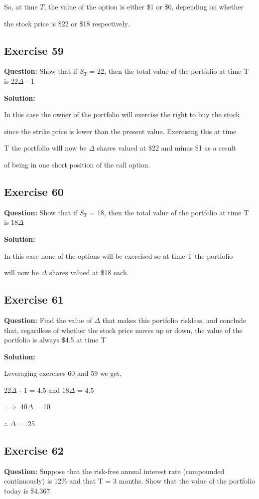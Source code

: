 \documentclass{article}
\begin{document}
So, at time $T$, the value of the option is either \$1 or \$0, depending on whether 

the stock price is \$22 or \$18 respectively.

\subsection*{Exercise 59}
\textbf{Question:} Show that if $S_T$ = 22, then the total value of the portfolio at time T is 22$\Delta$ - 1

\textbf{Solution:}

In this case the owner of the portfolio will exercise the right to buy the stock 

since the strike price is lower than the present value. Exercising this at time 

T the portfolio will now be $\Delta$ shares valued at \$22 and minus \$1 as a result 

of being in one short position of the call option.


\subsection*{Exercise 60}
\textbf{Question:} Show that if $S_T$ = 18, then the total value of the portfolio at time T is 18$\Delta$ 

\textbf{Solution:}

In this case none of the options will be exercised so at time T the portfolio 

will now be $\Delta$ shares valued at \$18 each.

\subsection*{Exercise 61}
\textbf{Question:} Find the value of $\Delta$ that makes this portfolio riskless, and conclude that, regardless of whether the stock price moves up or down, the value of the portfolio is always \$4.5 at time T  

\textbf{Solution:}

Leveraging exercises 60 and 59 we get,

22$\Delta$ - 1 = 4.5 and 18$\Delta$ = 4.5

$\implies$ 40$\Delta$ = 10 

$\therefore$ $\Delta$ = .25

\subsection*{Exercise 62}
\textbf{Question:} Suppose that the risk-free annual interest rate (compounded continuously) is 12\% and that T = 3 months. Show that the value of the portfolio today is \$4.367.
\end{document}
